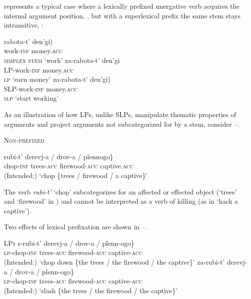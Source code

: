 \documentclass[output=paper,colorlinks,citecolor=brown]{langscibook}
\begin{document}
 represents a typical case where a lexically prefixed unergative verb acquires the internal argument position, , but with a superlexical prefix the same stem stays intransitive, :

\ea \label{tat:ex:24}     
\ea 
\gll rabota-t’  \minsp{(*} den’gi)\\
work-\textsc{inf}  {} money.\textsc{acc}\\\hfill \textsc{simplex stem}
\glt  ‘work’ \label{ex:tatevosov:24a}
\ex 
\gll za-rabota-t’  den’gi\\
LP-work-\textsc{inf}  money.\textsc{acc}\\\hfill \textsc{lp}
\glt  ‘earn money’\label{ex:tatevosov:24b}
\ex 
\gll   za-rabota-t’    \minsp{(*} den’gi)  \\
    SLP-work-\textsc{inf}  {} money.\textsc{acc}\\\hfill \textsc{slp}
\glt  ‘start working’\label{ex:tatevosov:24c}
\z
\z 

\noindent As an illustration of how LPs, unlike SLPs, manipulate thematic properties of arguments and project arguments not subcategorized for by a stem, consider --. 

\ea     \textsc{Non-prefixed}\label{tat:ex:25}

\gll  rubi-t’   \minsp{\{} derevj-a      /   drov-a   /    plennogo\}\\
  chop-\textsc{inf}  {} trees-\textsc{acc}  {}  firewood-\textsc{acc}  {} {}  captive.\textsc{acc}\\
\glt    (Intended:) ‘chop \{trees / firewood / a captive\}’
\z

\noindent The verb \textit{rubi-t’} ‘chop’ subcategorizes for an affected or effected object (‘trees’ and ‘firewood’ in ) and cannot be interpreted as a verb of killing (as in ‘hack a captive’). 

Two effects of lexical prefixation are shown in --.

\newpage
\ea   \textsc{LPs}\label{tat:ex:26}
\ea
\gll s-rubi-t’   \minsp{\{} derevj-a   /   \minsp{*} drov-a   /   \minsp{*} plenn-ogo\}\\
\textsc{lp}-chop-\textsc{inf}  {} trees-\textsc{acc}  {} {}  firewood-\textsc{acc}  {} {}    captive-\textsc{acc}\\
\glt     (Intended:) ‘chop down \{the trees / the firewood / the captive\}’\label{ex:tatevosov:26a}
\ex 
\gll   za-rubi-t’   \minsp{\{*} derevj-a   /   \minsp{*} drov-a   /   plenn-ogo\}\\
\textsc{lp}-chop-\textsc{inf}  {}   trees-\textsc{acc} {} {}     firewood-\textsc{acc}  {}  captive-\textsc{acc}\\
\glt      (Intended:) ‘slash \{the trees / the firewood / the captive\}’\label{ex:tatevosov:26b}
\z
\z
\end{document}
